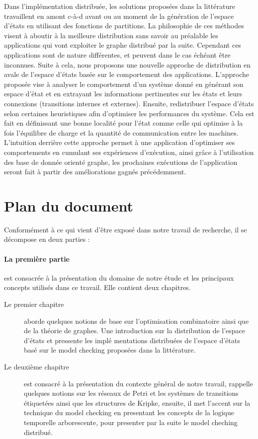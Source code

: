 Dans l’implémentation distribuée, les solutions proposées dans la littérature travaillent en amont c-à-d avant ou au moment de la génération de l’espace d’états en utilisant des fonctions de partitions. La philosophie de ces méthodes visent à aboutir à la meilleure distribution sans savoir au préalable les applications qui vont exploiter le graphe distribué par la suite. Cependant ces applications sont de nature différentes, et peuvent dans le cas échéant être inconnues. Suite à cela, nous proposons une nouvelle approche de distribution en avale de l'espace d'états basée sur le comportement des applications. L’approche proposée vise à analyser le comportement d’un système donné en générant son espace d’état et en extrayant les informations pertinentes sur les états et leurs connexions (transitions internes et externes). Ensuite, redistribuer l’espace d’états selon certaines heuristiques afin d’optimiser les performances du système. Cela est fait en définissant une bonne localité pour l'état comme celle qui optimise à la
fois l’équilibre de charge et la quantité de communication entre les machines. L’intuition derrière cette approche permet à une application d'optimiser ses comportements en cumulant ses expériences d’exécution, ainsi grâce à l'utilisation des base de donnée orienté graphe, les prochaines exécutions  de l’application seront fait à partir des améliorations gagnés précédemment.

\section{Plan du document}
Conformément à ce qui vient d’être exposé dans notre travail de recherche, il se décompose en deux parties :

\paragraph{La première partie} est consacrée à la présentation du domaine de notre étude et les
principaux concepts utilisés dans ce travail. Elle contient deux chapitres.
\begin{description}
	\item[Le premier chapitre] aborde quelques notions de base sur l’optimisation combinatoire ainsi que de la théorie de graphes. Une introduction sur la distribution de l'espace d'états et pressente les implé mentations distribuées de l'espace d'états basé sur le model checking proposées dans la littérature.
	\item [Le deuxième chapitre ] est consacré à la présentation du contexte général de notre travail, rappelle quelques notions sur les réseaux de Petri et les systèmes de transitions étiquetées ainsi que les structures de Kripke, ensuite, il met l’accent sur	la technique du model checking en presentant les concepts de la logique temporelle arborescente, pour presenter par la suite le model cheching distribué.
\end{description}

